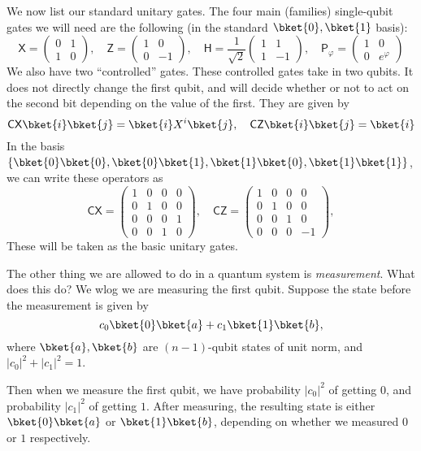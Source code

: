\documentclass[a4paper]{article}
\newcommand{\qCX}{\mathsf{CX}}
\newcommand{\qCZ}{\mathsf{CZ}}
\newcommand{\qH}{\mathsf{H}}
\newcommand{\qP}{\mathsf{P}}
\newcommand{\qX}{\mathsf{X}}
\newcommand{\qZ}{\mathsf{Z}}
\begin{document}
We now list our standard unitary gates. The four main (families) single-qubit gates we will need are the following (in the standard $\bket{0}, \bket{1}$ basis):
\[
  \qX =
  \begin{pmatrix}
    0 & 1\\
    1 & 0
  \end{pmatrix},\quad
  \qZ =
  \begin{pmatrix}
    1 & 0\\
    0 & -1
  \end{pmatrix},\quad
  \qH = \frac{1}{\sqrt{2}}
  \begin{pmatrix}
    1 & 1\\
    1 & -1
  \end{pmatrix},\quad
  \qP_\varphi =
  \begin{pmatrix}1 & 0\\0 & e^{\varphi}\end{pmatrix}
\]
We also have two ``controlled'' gates. These controlled gates take in two qubits. It does not directly change the first qubit, and will decide whether or not to act on the second bit depending on the value of the first. They are given by
\[
  \qCX\bket{i}\bket{j} = \bket{i} X^i\bket{j},\quad \qCZ \bket{i}\bket{j} = \bket{i}
\]
In the basis $\{\bket{0}\bket{0}, \bket{0}\bket{1}, \bket{1}\bket{0}, \bket{1}\bket{1}\}$, we can write these operators as
\[
  \qCX =
  \begin{pmatrix}
    1 & 0 & 0 & 0\\
    0 & 1 & 0 & 0\\
    0 & 0 & 0 & 1\\
    0 & 0 & 1 & 0
  \end{pmatrix},\quad
  \qCZ =
  \begin{pmatrix}
    1 & 0 & 0 & 0\\
    0 & 1 & 0 & 0\\
    0 & 0 & 1 & 0\\
    0 & 0 & 0 & -1
  \end{pmatrix},
\]
These will be taken as the basic unitary gates.

The other thing we are allowed to do in a quantum system is \emph{measurement}. What does this do? We wlog we are measuring the first qubit. Suppose the state before the measurement is given by
\[
  c_0 \bket{0} \bket{a} + c_1 \bket{1}\bket{b},
\]
where $\bket{a}, \bket{b}$ are $(n-1)$-qubit states of unit norm, and $|c_0|^2 + |c_1|^2 = 1$.

Then when we measure the first qubit, we have probability $|c_0|^2$ of getting $0$, and probability $|c_1|^2$ of getting $1$. After measuring, the resulting state is either $\bket{0}\bket{a}$ or $\bket{1}\bket{b}$, depending on whether we measured $0$ or $1$ respectively.
\end{document}
